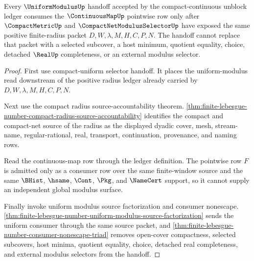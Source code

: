 \begin{theorem}
\label{thm:finite-lebesgue-number-uniform-continuity-handoff}
Every $\UniformModulusUp$ handoff accepted by the compact-continuous unblock ledger consumes the $\ContinuousMapUp$ pointwise row only after $\CompactMetricUp$ and $\CompactNetModulusSelectorUp$ have exposed the same positive finite-radius packet $D,W,\lambda,M,H,C,P,N$. The handoff cannot replace that packet with a selected subcover, a host minimum, quotient equality, choice, detached $\RealUp$ completeness, or an external modulus selector.
\end{theorem}
\begin{proof}
First use compact-uniform selector handoff. It places the uniform-modulus read downstream of the positive radius ledger already carried by $D,W,\lambda,M,H,C,P,N$.

Next use the compact radius source-accountability theorem. \autoref{thm:finite-lebesgue-number-compact-radius-source-accountability} identifies the compact and compact-net source of the radius as the displayed dyadic cover, mesh, stream-name, regular-rational, real, transport, continuation, provenance, and naming rows.

Read the continuous-map row through the ledger definition. The pointwise row $F$ is admitted only as a consumer row over the same finite-window source and the same $\BHist$, $\hsame$, $\Cont$, $\Pkg$, and $\NameCert$ support, so it cannot supply an independent global modulus surface.

Finally invoke uniform modulus source factorization and consumer nonescape. \autoref{thm:finite-lebesgue-number-uniform-modulus-source-factorization} sends the uniform consumer through the same source packet, and \autoref{thm:finite-lebesgue-number-consumer-nonescape-triad} removes open-cover compactness, selected subcovers, host minima, quotient equality, choice, detached real completeness, and external modulus selectors from the handoff.
\end{proof}
